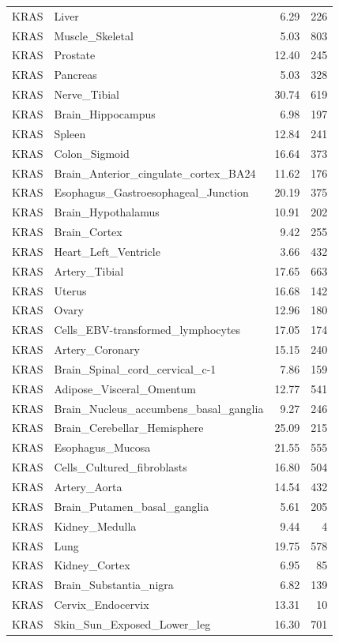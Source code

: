 \begin{footnotesize}
\begin{longtable}{llrr}
KRAS & Liver & 6.29 & 226 \\
KRAS & Muscle\_Skeletal & 5.03 & 803 \\
KRAS & Prostate & 12.40 & 245 \\
KRAS & Pancreas & 5.03 & 328 \\
KRAS & Nerve\_Tibial & 30.74 & 619 \\
KRAS & Brain\_Hippocampus & 6.98 & 197 \\
KRAS & Spleen & 12.84 & 241 \\
KRAS & Colon\_Sigmoid & 16.64 & 373 \\
KRAS & Brain\_Anterior\_cingulate\_cortex\_BA24 & 11.62 & 176 \\
KRAS & Esophagus\_Gastroesophageal\_Junction & 20.19 & 375 \\
KRAS & Brain\_Hypothalamus & 10.91 & 202 \\
KRAS & Brain\_Cortex & 9.42 & 255 \\
KRAS & Heart\_Left\_Ventricle & 3.66 & 432 \\
KRAS & Artery\_Tibial & 17.65 & 663 \\
KRAS & Uterus & 16.68 & 142 \\
KRAS & Ovary & 12.96 & 180 \\
KRAS & Cells\_EBV-transformed\_lymphocytes & 17.05 & 174 \\
KRAS & Artery\_Coronary & 15.15 & 240 \\
KRAS & Brain\_Spinal\_cord\_cervical\_c-1 & 7.86 & 159 \\
KRAS & Adipose\_Visceral\_Omentum & 12.77 & 541 \\
KRAS & Brain\_Nucleus\_accumbens\_basal\_ganglia & 9.27 & 246 \\
KRAS & Brain\_Cerebellar\_Hemisphere & 25.09 & 215 \\
KRAS & Esophagus\_Mucosa & 21.55 & 555 \\
KRAS & Cells\_Cultured\_fibroblasts & 16.80 & 504 \\
KRAS & Artery\_Aorta & 14.54 & 432 \\
KRAS & Brain\_Putamen\_basal\_ganglia & 5.61 & 205 \\
KRAS & Kidney\_Medulla & 9.44 & 4 \\
KRAS & Lung & 19.75 & 578 \\
KRAS & Kidney\_Cortex & 6.95 & 85 \\
KRAS & Brain\_Substantia\_nigra & 6.82 & 139 \\
KRAS & Cervix\_Endocervix & 13.31 & 10 \\
KRAS & Skin\_Sun\_Exposed\_Lower\_leg & 16.30 & 701 \\

\end{longtable}
\end{footnotesize}
